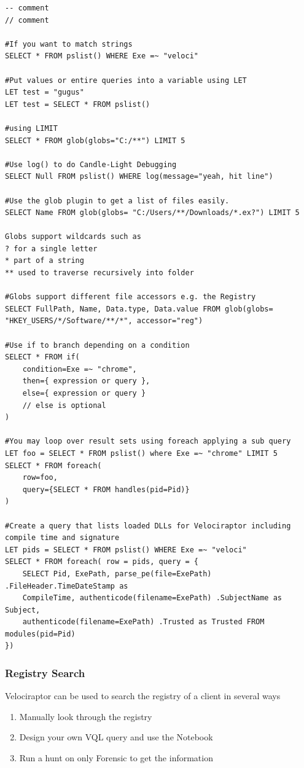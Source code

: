 \begin{lstlisting}
-- comment
// comment

#If you want to match strings
SELECT * FROM pslist() WHERE Exe =~ "veloci"

#Put values or entire queries into a variable using LET
LET test = "gugus"
LET test = SELECT * FROM pslist()

#using LIMIT
SELECT * FROM glob(globs="C:/**") LIMIT 5

#Use log() to do Candle-Light Debugging
SELECT Null FROM pslist() WHERE log(message="yeah, hit line")

#Use the glob plugin to get a list of files easily.
SELECT Name FROM glob(globs= "C:/Users/**/Downloads/*.ex?") LIMIT 5

Globs support wildcards such as
? for a single letter
* part of a string
** used to traverse recursively into folder

#Globs support different file accessors e.g. the Registry
SELECT FullPath, Name, Data.type, Data.value FROM glob(globs= "HKEY_USERS/*/Software/**/*", accessor="reg")

#Use if to branch depending on a condition
SELECT * FROM if(
    condition=Exe =~ "chrome",
    then={ expression or query },
    else={ expression or query }
    // else is optional
)

#You may loop over result sets using foreach applying a sub query
LET foo = SELECT * FROM pslist() where Exe =~ "chrome" LIMIT 5
SELECT * FROM foreach(
    row=foo,
    query={SELECT * FROM handles(pid=Pid)}
)

#Create a query that lists loaded DLLs for Velociraptor including compile time and signature
LET pids = SELECT * FROM pslist() WHERE Exe =~ "veloci"
SELECT * FROM foreach( row = pids, query = {
    SELECT Pid, ExePath, parse_pe(file=ExePath) .FileHeader.TimeDateStamp as
    CompileTime, authenticode(filename=ExePath) .SubjectName as Subject,
    authenticode(filename=ExePath) .Trusted as Trusted FROM modules(pid=Pid)
})
\end{lstlisting}

\subsubsection{Registry Search}
Velociraptor can be used to search the registry of a client in several ways
\begin{enumerate}
    \item Manually look through the registry
    \item Design your own VQL query and use the Notebook
    \item Run a hunt on only Forensic to get the information
\end{enumerate}

